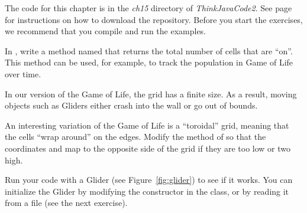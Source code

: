 The code for this chapter is in the {\it ch15} directory of {\it ThinkJavaCode2}.
See page~\pageref{code} for instructions on how to download the repository.
Before you start the exercises, we recommend that you compile and run the examples.


\begin{exercise}
In , write a method named  that returns the total number of cells that are ``on''.
This method can be used, for example, to track the population in Game of Life over time.
\end{exercise}


\begin{exercise}
In our version of the Game of Life, the grid has a finite size.
As a result, moving objects such as Gliders either crash into the wall or go out of bounds.

An interesting variation of the Game of Life is a ``toroidal'' grid, meaning that the cells ``wrap around'' on the edges.
Modify the  method of  so that the coordinates  and  map to the opposite side of the grid if they are too low or two high.

Run your code with a Glider (see Figure~\ref{fig:glider}) to see if it works.
You can initialize the Glider by modifying the constructor in the  class, or by reading it from a file (see the next exercise).
\end{exercise}





